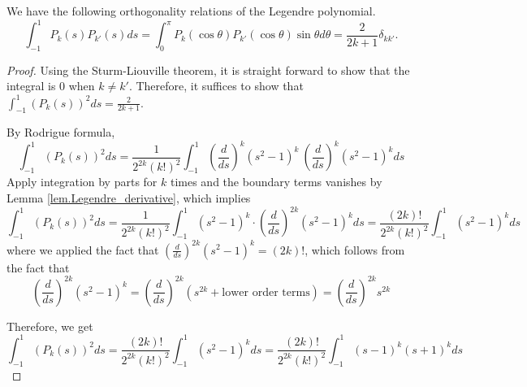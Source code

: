 \begin{proposition}[]
We have the following orthogonality relations of the Legendre polynomial.
\begin{equation}\label{eq.Legendre_orthogonality}
    \int_{-1}^1 P_k(s) P_{k'}(s) d s=\int_0^\pi P_k(\cos \theta) P_{k'}(\cos \theta) \sin \theta d \theta=\frac{2}{2k+1}\delta_{kk'}.
\end{equation}
\end{proposition}
\begin{proof} 
Using the Sturm-Liouville theorem, it is straight forward to show that the integral is 0 when $k\neq k'$. Therefore, it suffices to show that $\int_{-1}^1 (P_k(s))^2 d s = \frac{2}{2k+1}$.

By Rodrigue formula, 
\begin{equation}\label{eq.proof_orthogonal_Legendre_1}
    \int_{-1}^1 (P_k(s))^2 d s = \frac{1}{2^{2k} (k!)^2}\int_{-1}^1\left(\frac{d}{d s}\right)^k\left(s^2-1\right)^k\ \left(\frac{d}{d s}\right)^k\left(s^2-1\right)^k d s
\end{equation}
Apply integration by parts for $k$ times and the boundary terms vanishes by Lemma \ref{lem.Legendre_derivative}, which implies
\begin{equation}\label{eq.proof_orthogonal_Legendre_2}
    \int_{-1}^1 (P_k(s))^2 d s = \frac{1}{2^{2k} (k!)^2}\int_{-1}^1 \left(s^2-1\right)^k\cdot \left(\frac{d}{d s}\right)^{2k}\left(s^2-1\right)^k d s = \frac{(2k)!}{2^{2k} (k!)^2}\int_{-1}^1 \left(s^2-1\right)^k d s
\end{equation}
where we applied the fact that $\left(\frac{d}{d s}\right)^{2k}\left(s^2-1\right)^k = (2k)!$, which follows from the fact that 
\begin{equation}\label{eq.proof_orthogonal_Legendre_3}
    \left(\frac{d}{d s}\right)^{2k}\left(s^2-1\right)^k = \left(\frac{d}{d s}\right)^{2k}(s^{2k} + \textrm{lower order terms}) = \left(\frac{d}{d s}\right)^{2k} s^{2k}
\end{equation}

Therefore, we get
\begin{equation}\label{eq.proof_orthogonal_Legendre_4}
    \int_{-1}^1 (P_k(s))^2 d s = \frac{(2k)!}{2^{2k} (k!)^2}\int_{-1}^1 \left(s^2-1\right)^k d s  = \frac{(2k)!}{2^{2k} (k!)^2}\int_{-1}^1 \left(s-1\right)^k \left(s+1\right)^k d s
\end{equation}


\end{proof}
